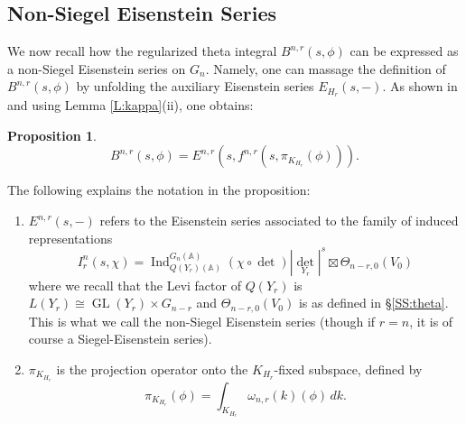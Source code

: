 \documentclass[10pt]{amsart}
\theoremstyle{plain}
\newtheorem{Prop}[equation]{Proposition}
\numberwithin{equation}{section}
\begin{document}
 \subsection{\bf Non-Siegel Eisenstein Series}\label{S:non_Siegel_Eisen}
 We now recall how the regularized theta integral $B^{n,r}(s, \phi)$
 can be expressed as a non-Siegel Eisenstein series on $G_n$.
Namely, one can massage the definition of $B^{n,r}(s, \phi)$ by
unfolding the auxiliary Eisenstein series $E_{H_r}(s,-)$.  As shown in \cite[\S
5.5, p.48-50]{KR5} and using Lemma \ref{L:kappa}(ii), one obtains:
\begin{Prop} \label{P:non-Siegel}
\[   B^{n,r}(s, \phi)  = E^{n,r}(s,  f^{n,r}(s, \pi_{K_{H_r}}(\phi))). \]
 \end{Prop}
\noindent The following explains the notation in the proposition: 
 \begin{enumerate}[$\bullet$]
 \item $E^{n,r}(s, -)$ refers to the Eisenstein series associated to
   the family of induced representations
 \[   I^n_r(s,\chi) =  {\operatorname{Ind}}_{Q(Y_r)({\mathbb{A}})}^{G_{n}({\mathbb{A}})}  (\chi \circ \det)
 |{\det}_{Y_r}|^s \boxtimes \Theta_{n-r,0}(V_0)  \]
 where we recall that the Levi factor of $Q(Y_r)$ is $L(Y_r) \cong
 {\operatorname{GL}}(Y_r) \times G_{n-r}$ and $\Theta_{n-r,0}(V_0)$ is as defined in
 \S \ref{SS:theta}. This is what we call the non-Siegel Eisenstein
 series  (though if $r = n$, it is of course a Siegel-Eisenstein
 series).
 
 \item $\pi_{K_{H_r}}$ is the projection operator onto the $K_{H_r}$-fixed subspace, defined by
 \[  \pi_{K_{H_r}}(\phi) =  \int_{K_{H_r}}  \omega_{n,r}(k)( \phi) \, dk. \]
 

\end{enumerate}
\end{document}
